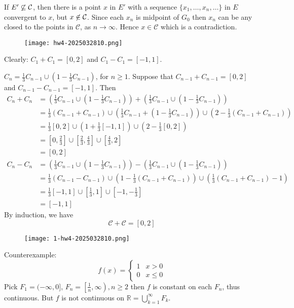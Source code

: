If $E'\centernot{\subseteq}\mathcal{C}$, then there is a point $x$ in $E'$ with a sequence $\{ x_1,\dots,x_n,\dots \}$ in $E$ convergent to $x$, but $x\centernot{\in}\mathcal{C}$. Since each $x_n$ is midpoint of $G_0$ then $x_n$ can be any closed to the points in $\mathcal{C}$, as $n\to \infty$. Hence $x\in \mathcal{C}$ which is a contradiction.

\begin{figure}[H]
\centering
\texttt{[image: hw4-2025032810.png]}
\label{}
\end{figure}
Clearly: $C_1+C_1=[0,2]$ and $C_1-C_1=[-1,1]$.

$C_n=\frac{1}{3}C_{n-1}\cup\left( 1-\frac{1}{3}C_{n-1} \right)$, for $n\geq1$. Suppose that $C_{n-1}+C_{n-1}=[0,2]$ and $C_{n-1}-C_{n-1}=[-1,1]$. Then
\[
\begin{aligned}
C_n+C_n & =\left( \frac{1}{3}C_{n-1}\cup\left( 1-\frac{1}{3}C_{n-1} \right) \right)+\left( \frac{1}{3}C_{n-1}\cup\left( 1-\frac{1}{3}C_{n-1} \right) \right) \\
 & =\frac{1}{3}(C_{n-1}+C_{n-1})\cup\left( \frac{1}{3}C_{n-1}+\left( 1-\frac{1}{3}C_{n-1} \right) \right)\cup\left( 2-\frac{1}{3}(C_{n-1}+C_{n-1}) \right)  \\
 & =\frac{1}{3}[0,2]\cup\left( 1+\frac{1}{3}[-1,1] \right)\cup \left( 2-\frac{1}{3}[0,2] \right) \\
 & =\left[ 0,\frac{2}{3} \right]\cup\left[ \frac{2}{3},\frac{4}{3} \right]\cup\left[ \frac{4}{3},2 \right] \\
 & =[0,2]
\end{aligned}
\]
\[
\begin{aligned}
C_n-C_n & =\left( \frac{1}{3}C_{n-1}\cup\left( 1-\frac{1}{3}C_{n-1} \right) \right)-\left( \frac{1}{3}C_{n-1}\cup\left( 1-\frac{1}{3}C_{n-1} \right) \right) \\
 & =\frac{1}{3}(C_{n-1}-C_{n-1})\cup\left( 1-\frac{1}{3}(C_{n-1}+C_{n-1}) \right) \cup\left( \frac{1}{3}(C_{n-1}+C_{n-1})-1 \right) \\
 & =\frac{1}{3}[-1,1]\cup\left[ \frac{1}{3},1 \right]\cup\left[ -1,-\frac{1}{3} \right] \\
 & =[-1,1]
\end{aligned}
\]
By induction, we have
\[
\mathcal{C}+\mathcal{C}=[0,2]
\]
\begin{figure}[H]
\centering
\texttt{[image: 1-hw4-2025032810.png]}
\label{}
\end{figure}

Counterexample:
\[
f(x)=\begin{cases}
1 & x> 0  \\
0 & x\leq 0
\end{cases}
\]
Pick $F_1=(-\infty,0]$, $F_n=\left[ \frac{1}{n},\infty \right),n\geq2$ then $f$ is constant on each $F_n$, thus continuous. But $f$ is not continuous on $\mathbb{R}=\bigcup_{k=1}^{\infty}F_k$.

